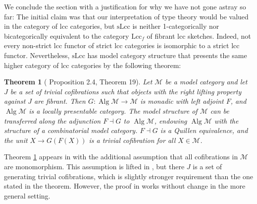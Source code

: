 \documentclass[a4paper]{article}
\newtheorem{theorem}{Theorem}
\theoremstyle{remark}
\theoremstyle{definition}
\begin{document}
We conclude the section with a justification for why we have not gone astray so far:
The initial claim was that our interpretation of type theory would be valued in the category of lcc categories, but $\mathrm{sLcc}$ is neither 1-categorically nor bicategorically equivalent to the category $\mathrm{Lcc}_f$ of fibrant lcc sketches.
Indeed, not every non-strict lcc functor of strict lcc categories is isomorphic to a strict lcc functor.
Nevertheless, $\mathrm{sLcc}$ has model category structure that presents the same higher category of lcc categories by the following theorem:
\begin{theorem}[\cite{algebraic-models} Proposition 2.4, \cite{equipping-weak-equivalences} Theorem 19]
  \label{th:algebraically-fibrant-model-category}
  Let $\mathcal{M}$ be a model category and let $J$ be a set of trivial cofibrations such that objects with the right lifting property against $J$ are fibrant.
  Then $G : \operatorname{Alg} \mathcal{M} \rightarrow \mathcal{M}$ is monadic with left adjoint $F$, and $\operatorname{Alg} \mathcal{M}$ is a locally presentable category.
  The model structure of $\mathcal{M}$ can be transferred along the adjunction $F \dashv G$ to $\operatorname{Alg} \mathcal{M}$, endowing $\operatorname{Alg} \mathcal{M}$ with the structure of a combinatorial model category.
  $F \dashv G$ is a Quillen equivalence, and the unit $X \rightarrow G(F(X))$ is a trivial cofibration for all $X \in \mathcal{M}$.
\end{theorem}
Theorem \ref{th:algebraically-fibrant-model-category} appears in \cite{algebraic-models} with the additional assumption that all cofibrations in $\mathcal{M}$ are monomorphism.
This assumption is lifted in \cite{equipping-weak-equivalences}, but there $J$ is a set of generating trivial cofibrations, which is slightly stronger requirement than the one stated in the theorem.
However, the proof in \cite{equipping-weak-equivalences} works without change in the more general setting.
\end{document}
